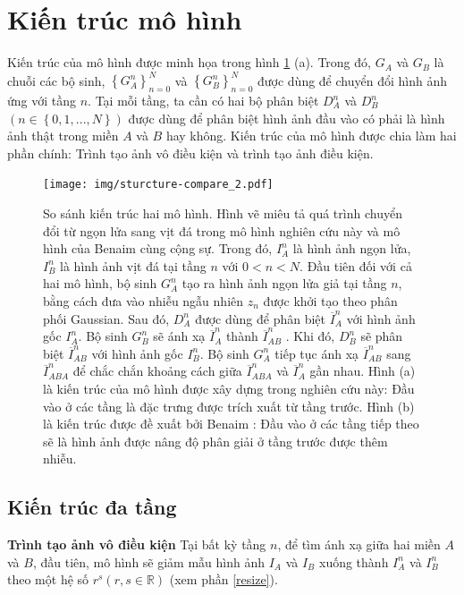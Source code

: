 \documentclass[12pt]{report}%
\begin{document}
\section{Kiến trúc mô hình}
Kiến trúc của mô hình được minh họa trong hình \ref{fig:model-structure} (a). Trong đó, $G_A$ và $G_B$ là chuỗi các bộ sinh, $\left\{ G_A ^n\right\}_{n=0} ^N$ và $\left\{ G_B ^n \right\}_{n=0} ^N$ được dùng để chuyển đổi hình ảnh ứng với tầng $n$. Tại mỗi tầng,  ta cần có hai bộ phân biệt $D_A ^n$ và $D_B ^n$ $\left( n \in \left\{ 0,1,...,N\right\}\right)$ được dùng để phân biệt hình ảnh đầu vào có phải là hình ảnh thật trong miền $A$ và $B$ hay không. Kiến trúc của mô hình được chia làm hai phần chính: Trình tạo ảnh vô điều kiện và trình tạo ảnh điều kiện. 
\begin{figure}[p]
\vspace{-0.5cm}
	\centering
	\texttt{[image: img/sturcture-compare\_2.pdf]}
	\caption[So sánh kiến trúc hai mô hình]{\blindtext So sánh kiến trúc hai mô hình. \quad Hình vẽ miêu tả quá trình chuyển đổi từ ngọn lửa sang vịt đá trong mô hình nghiên cứu này và mô hình của Benaim cùng cộng sự. Trong đó, $I_A ^n$ là hình ảnh ngọn lửa, $I_B ^n$ là hình ảnh vịt đá tại tầng $n$ với $0<n<N$. Đầu tiên đối với cả hai mô hình, bộ sinh $G_A ^n$ tạo ra hình ảnh ngọn lửa giả tại tầng $n$, bằng cách đưa vào nhiễu ngẫu nhiên $z_n$ được khởi tạo theo phân phối Gaussian. Sau đó,  $D_A ^n$ được dùng để phân biệt $\overline{I}_A ^n$ với hình ảnh gốc $I_A ^n$. Bộ sinh $G_B ^n$ sẽ ánh xạ $\overline{I}_A ^n$ thành $\overline{I}_{AB} ^n$ . Khi đó, $D_B ^n$ sẽ phân biệt $\overline{I}_{AB} ^n$ với hình ảnh gốc $I_B ^n$. Bộ sinh $G_A ^n$ tiếp tục ánh xạ $\overline{I}_{AB} ^n$ sang $\overline{I}_{ABA} ^n$ để chắc chắn khoảng cách giữa $\overline{I}_{ABA} ^n$ và $\overline{I}_{A} ^n$ gần nhau. Hình (a) là kiến trúc của mô hình được xây dựng trong nghiên cứu này: Đầu vào ở các tầng là đặc trưng được trích xuất từ tầng trước. Hình (b) là kiến trúc được đề xuất bởi Benaim \cite{benaim2020structuralanalogy}: Đầu vào ở các tầng tiếp theo sẽ  là hình ảnh được nâng độ phân giải ở tầng trước được thêm nhiễu.}
	\label{fig:model-structure} \vspace{-0.4cm}
\end{figure}
\subsection{Kiến trúc đa tầng}

\textbf{Trình tạo ảnh vô điều kiện} \quad 
Tại bất kỳ tầng $n$, để tìm ánh xạ giữa hai miền $A$ và $B$, đầu tiên, mô hình sẽ giảm mẫu	 hình ảnh $I_A$ và $I_B$ xuống thành $I_A ^n$ và $I_B ^n$ theo một hệ số $r^s \left(r,s \in \mathbb{R} \right)$ (xem phần \ref{resize}).
\end{document}
